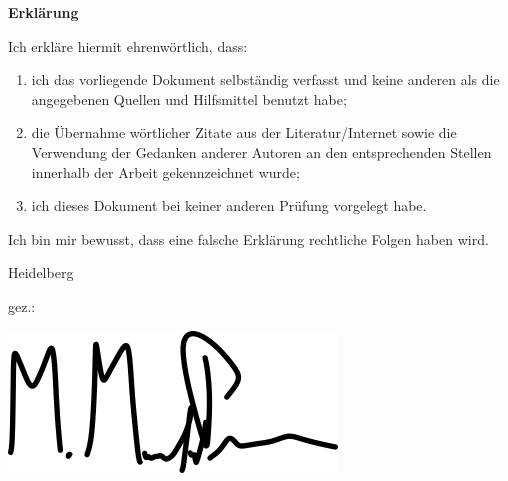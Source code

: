 
{\cleardoublepage%
\let\clearpage\relax%

\LARGE
\textbf{Erklärung}
\vspace{1.0cm}
}

\noindent
Ich erkläre hiermit ehrenwörtlich, dass:
\begin{enumerate}
    \item{ich das vorliegende Dokument selbständig verfasst und keine anderen als die angegebenen Quellen und Hilfsmittel benutzt habe;}
    \item{die Übernahme wörtlicher Zitate aus der Literatur/Internet sowie die Verwendung der Gedanken anderer Autoren an den entsprechenden Stellen innerhalb der Arbeit gekennzeichnet wurde;}
    \item{ich dieses Dokument bei keiner anderen Prüfung vorgelegt habe.}
\end{enumerate}
Ich bin mir bewusst, dass eine falsche Erklärung rechtliche Folgen haben wird. 

\par
\vspace{10mm}
\noindent
Heidelberg \mydate
\par
\vspace{12mm}
\noindent
gez.:

\includegraphics{rattenschwanz/unterschrift.png}

